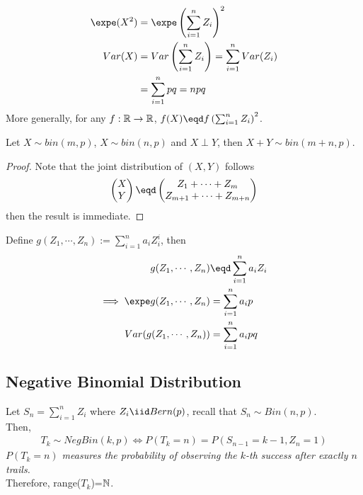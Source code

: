 \documentclass{article}
\begin{document}
   	\begin{corollary}
   		\begin{align}
   			\expe (X^2) &= \expe \left ( \sum_{i=1}^n Z_i \right)^2 \\
   			Var(X) &= Var \left( \sum_{i=1}^n Z_i \right)
   			= \sum_{i=1}^n Var(Z_i) \\
   			&= \sum_{i=1}^n pq
   			= npq
   		\end{align}
   		More generally, for any $f: \mathbb{R} \to \mathbb{R}$, $f(X) \eqd f \left( \sum_{i=1}^n Z_i \right)^2$.
   	\end{corollary}
   	
   	\begin{proposition}
   		Let $X \sim bin (m, p)$, $X \sim bin(n, p)$ and $X \perp Y$, then $X + Y \sim bin(m + n, p)$.
   	\end{proposition}
   	
   	\begin{proof}
   		Note that the joint distribution of $(X, Y)$ follows 
   		\begin{align}
   			\begin{pmatrix}
   				X \\ Y
   			\end{pmatrix}
   			\eqd
   			\begin{pmatrix}
   				Z_1 + \cdots + Z_m \\
   				Z_{m+1} + \cdots + Z_{m+n}
   			\end{pmatrix}
   		\end{align}
		then the result is immediate.
   	\end{proof}
   	
   	\begin{example}
   		Define $g(Z_1, \cdots, Z_n) := \sum_{i=1}^n a_i Z_i^i$, then 
   		\begin{align}
   			g(Z_1, \cdots, Z_n) &\eqd \sum_{i=1}^n a_i Z_i \\
   			\implies \expe g(Z_1, \cdots, Z_n) &= \sum_{i=1}^n a_i p \\
   			Var(g(Z_1, \cdots, Z_n)) &= \sum_{i=1}^n a_i pq
   		\end{align}
   	\end{example}
   	
   	\subsection{Negative Binomial Distribution}
   	
   	\begin{definition}
   		Let $S_n = \sum_{i=1}^n Z_i$ where $Z_i \iid Bern(p)$, recall that $S_n \sim Bin(n, p)$.\\
   		Then,
   		\begin{align}
   			T_k \sim NegBin(k, p) \iff P(T_k = n) = P(S_{n-1}=k-1, Z_n = 1)
   		\end{align}
   		\emph{$P(T_k=n)$ measures the probability of observing the $k$-th success after exactly $n$ trails.} \\
   		Therefore, range($T_k$)=$\mathbb{N}$.
   	\end{definition}
   	
\end{document}

